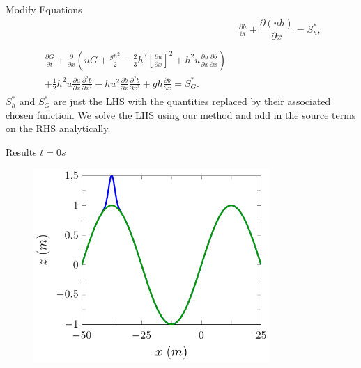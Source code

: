 \documentclass[pdf]{beamer}
\begin{document}
\begin{frame}{Modify Equations}
		\begin{align*}
		& \frac{\partial h}{\partial t} + \dfrac{\partial (uh)}{\partial x} = S_h^* ,  \\ \nonumber \\
		\begin{split}
		\frac{\partial G}{\partial t}  + \frac{\partial}{\partial x} \left( {u} G + \frac{gh^2}{2} - \frac{2}{3}h^3 \left[\frac{\partial {u}}{\partial x}\right]^2 + h^2 {u}\frac{\partial {u}}{\partial x}\frac{\partial b}{\partial x} \right) \\ + \frac{1}{2}h^2 {u} \frac{\partial {u}}{\partial x} \frac{\partial^2 b}{\partial x^2}  - h {u}^2\frac{\partial b}{\partial x}\frac{\partial^2 b}{\partial x^2} + gh\frac{\partial b}{\partial x} = S_G^* .
		\end{split}
		\end{align*}
		$S_h^*$ and $S_G^*$ are just the LHS  with the quantities replaced by their associated chosen function. We solve the LHS using our method and add in the source terms on the RHS analytically.
\end{frame}

\begin{frame}{Results $t=0s$}
\begin{figure}
	\includegraphics[width=0.8\textwidth]{./Pics/DryBed/Forced/Stages0.pdf}
\end{figure}
\end{frame}
\end{document}
